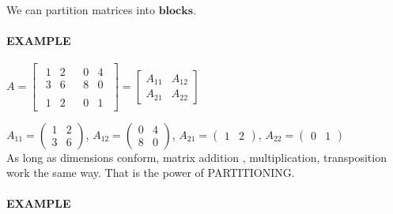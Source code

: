 \documentclass[]{article}
\let\oldparagraph\paragraph
\renewcommand{\paragraph}[1]{\oldparagraph{#1}\mbox{}}
\begin{document}
We can partition matrices into \(\textbf{blocks}\).\\

\paragraph{\texorpdfstring{EXAMPLE\\
}{EXAMPLE }}\label{example-2}

\(A=\left[\begin{array}{c|c}\begin{matrix} 1 & 2 \\ 3 & 6 \end{matrix} & \begin{matrix} 0 & 4 \\ 8 & 0 \end{matrix} \\ \hline \begin{matrix} 1 & 2 \end{matrix} & \begin{matrix} 0 & 1\end{matrix} \end{array} \right]=\left[\begin{array}{c|c}A_{11} & A_{12} \\ \hline A_{21} & A_{22} \end{array} \right]\)

\(A_{11}=\begin{pmatrix} 1 & 2 \\ 3 & 6 \end{pmatrix}\),
\(A_{12}=\begin{pmatrix} 0 & 4 \\ 8 & 0 \end{pmatrix}\),
\(A_{21}= \begin{pmatrix} 1 & 2\end{pmatrix}\),
\(A_{22}= \begin{pmatrix} 0 & 1\end{pmatrix}\)\\

As long as dimensions conform, matrix addition , multiplication,
transposition work the same way. That is the power of PARTITIONING.\\

\paragraph{\texorpdfstring{EXAMPLE\\
}{EXAMPLE }}\label{example-3}
\end{document}

